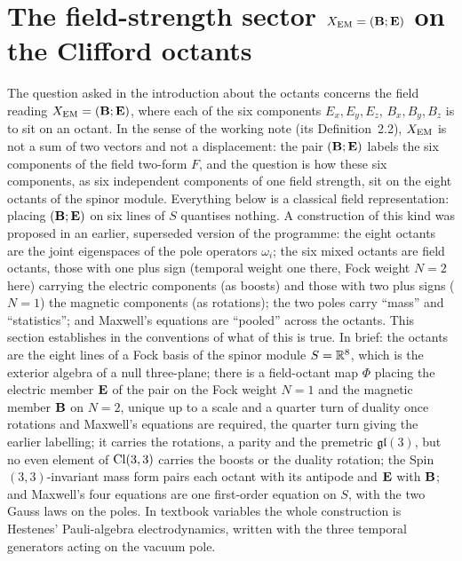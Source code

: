 \section{\texorpdfstring{The field-strength sector $X_{\rm EM}=(\mathbf B;\mathbf E)$ on the Clifford octants}{The field-strength sector X\_EM = (B;E) on the Clifford octants}}
\label{r3:sec:main}

The question asked in the introduction about the octants concerns the field reading $X_{\rm EM}=(\mathbf B;\mathbf E)$, where each of the six components
$E_x,E_y,E_z$, $B_x,B_y,B_z$ is to sit on an octant. In the sense of the working note \cite{FMB} (its Definition~2.2), $X_{\rm EM}$ is not a sum
of two vectors and not a displacement: the pair $(\mathbf B;\mathbf E)$ labels the six components of the field two-form $F$, and the question is how
these six components, as six independent components of one field strength, sit on the eight octants of the spinor module. Everything below
is a classical field representation: placing $(\mathbf B;\mathbf E)$ on six lines of $S$ quantises nothing. A construction of this kind was proposed in an earlier, superseded version of the programme: the eight octants are the joint
eigenspaces of the pole operators $\omega_i$; the six mixed octants are field octants, those with one plus sign (temporal weight one
there, Fock weight $N=2$ here) carrying the electric components (as boosts) and those with two plus signs ($N=1$) the magnetic
components (as rotations); the two poles carry ``mass'' and
``statistics''; and Maxwell's equations are ``pooled'' across the octants. This section establishes in the conventions of \cite{ES17}
what of this is true. In brief: the octants are the eight lines of a Fock basis of the spinor module $S=\mathbb{R}^8$, which is the exterior
algebra of a null three-plane; there is a field-octant map $\Phi$ placing the electric member $\mathbf E$ of the pair on the Fock weight $N=1$ and the magnetic member $\mathbf B$ on $N=2$, unique up to
a scale and a quarter turn of duality once rotations and Maxwell's equations are required, the quarter turn giving the earlier
labelling; it carries the rotations, a parity and the
premetric $\mathfrak{gl}(3)$, but no even element of $\mathrm{Cl}(3,3)$ carries the boosts or the duality rotation; the Spin$(3,3)$-invariant mass
form pairs each octant with its antipode and $\mathbf E$ with $\mathbf B$; and Maxwell's four equations are one first-order equation on $S$, with the
two Gauss laws on the poles. In textbook variables the whole construction is Hestenes' Pauli-algebra electrodynamics, written with
the three temporal generators acting on the vacuum pole.

